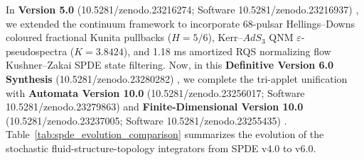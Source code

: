 \documentclass[11pt,a4paper,reqno]{article}
\def\texttt#1{#1}%
\def\mathrm#1{#1}%
\def\mathcal#1{#1}%
\def\zenodo#1{10.5281/zenodo.#1}%
\newcommand{\zenodo}[1]{\href{https://doi.org/10.5281/zenodo.#1}{\texttt{10.5281/\allowbreak zenodo.#1}}}
\theoremstyle{plain}
\theoremstyle{definition}
\theoremstyle{remark}
\numberwithin{equation}{section}
\begin{document}
\medskip\noindent
In \textbf{Version 5.0} (\zenodo{23216274}; Software \zenodo{23216937}) \cite{ananda2026spde_v50}, we extended the continuum framework to incorporate 68-pulsar Hellings--Downs coloured fractional Kunita pullbacks ($H=5/6$), Kerr--$\mathrm{AdS}_3$ QNM $\varepsilon$-pseudospectra ($\mathcal{K}=3.8424$), and 1.18 ms amortized RQS normalizing flow Kushner--Zakai SPDE state filtering. Now, in this \textbf{Definitive Version 6.0 Synthesis} (\zenodo{23280282}) \cite{ananda2026spde_v60}, we complete the tri-applet unification with \textbf{Automata Version 10.0} (\zenodo{23256017}; Software \zenodo{23279863}) \cite{ananda2026automata_v100} and \textbf{Finite-Dimensional Version 10.0} (\zenodo{23237005}; Software \zenodo{23255435}) \cite{ananda2026finite_v100}. Table~\ref{tab:spde_evolution_comparison} summarizes the evolution of the stochastic fluid-structure-topology integrators from SPDE v4.0 to v6.0.
\end{document}
